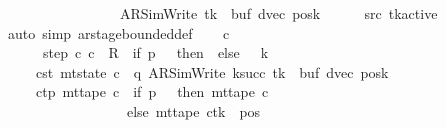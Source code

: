 \begin{isabellebody}
\ \ \ \ \ \ \ \ \ \ \ \ \ \ \ \ \ {\isacharparenleft}{\kern0pt}AR{\isacharunderscore}{\kern0pt}SimWrite{\isacharcomma}{\kern0pt}\ {\isacharquery}{\kern0pt}tk{\isacharcomma}{\kern0pt}\ {}{\isacharcomma}{\kern0pt}\ buf{\isacharcomma}{\kern0pt}\ dvec{\isacharcomma}{\kern0pt}\ posk{\isacharparenright}{\kern0pt}{\isachardoublequoteclose}\isanewline
\ \ \ \ \isamarkupfalse%
\ src{}\ tk{\isacharunderscore}{\kern0pt}active\ \isamarkupfalse%
\ {\isacharparenleft}{\kern0pt}auto\ simp{\isacharcolon}{\kern0pt}\ ar{\isacharunderscore}{\kern0pt}stage{\isacharunderscore}{\kern0pt}bounded{\isacharunderscore}{\kern0pt}def{\isacharparenright}{\kern0pt}\isanewline
\ \ \isamarkupfalse%
\ c{\isacharprime}{\kern0pt}\ \isanewline
\ \ \ \ \ \ step{\isacharcolon}{\kern0pt}\ {\isachardoublequoteopen}{\isacharparenleft}{\kern0pt}c{\isacharcomma}{\kern0pt}\ c{\isacharprime}{\kern0pt}{\isacharparenright}{\kern0pt}\ {\isasymin}\ R{\isacharprime}{\kern0pt}\ {\isacharcircum}{\kern0pt}{\isacharcircum}{\kern0pt}\ {\isacharparenleft}{\kern0pt}if\ {\isacharquery}{\kern0pt}p\ {\isacharequal}{\kern0pt}\ {}\ then\ {}\ else\ {}\ {\isacharasterisk}{\kern0pt}\ {\isacharquery}{\kern0pt}k{\isacharparenright}{\kern0pt}{\isachardoublequoteclose}\isanewline
\ \ \ \ \ c{\isacharprime}{\kern0pt}{\isacharunderscore}{\kern0pt}st{\isacharcolon}{\kern0pt}\ {\isachardoublequoteopen}mt{\isacharunderscore}{\kern0pt}state\ c{\isacharprime}{\kern0pt}\ {\isacharequal}{\kern0pt}\ {\isacharparenleft}{\kern0pt}q{\isacharcomma}{\kern0pt}\ AR{\isacharunderscore}{\kern0pt}SimWrite{\isacharcomma}{\kern0pt}\ k{\isacharunderscore}{\kern0pt}succ\ {\isacharquery}{\kern0pt}tk{\isacharcomma}{\kern0pt}\ {}{\isacharcomma}{\kern0pt}\ buf{\isacharcomma}{\kern0pt}\ dvec{\isacharcomma}{\kern0pt}\ posk{\isacharparenright}{\kern0pt}{\isachardoublequoteclose}\isanewline
\ \ \ \ \ c{\isacharprime}{\kern0pt}{\isacharunderscore}{\kern0pt}tp{\isacharcolon}{\kern0pt}\ {\isachardoublequoteopen}mt{\isacharunderscore}{\kern0pt}tape\ c{\isacharprime}{\kern0pt}\ {\isacharequal}{\kern0pt}\ {\isacharparenleft}{\kern0pt}if\ {\isacharquery}{\kern0pt}p\ {\isacharequal}{\kern0pt}\ {}\ then\ mt{\isacharunderscore}{\kern0pt}tape\ c\isanewline
\ \ \ \ \ \ \ \ \ \ \ \ \ \ \ \ \ \ else\ {\isacharparenleft}{\kern0pt}mt{\isacharunderscore}{\kern0pt}tape\ c{\isacharparenright}{\kern0pt}{\isacharparenleft}{\kern0pt}{\isacharquery}{\kern0pt}tk\ {\isacharcolon}{\kern0pt}{\isacharequal}{\kern0pt}\ {\isacharparenleft}{\kern0pt}{\isasymlambda}pos{\isachardot}{\kern0pt}\isanewline

\end{isabellebody}
